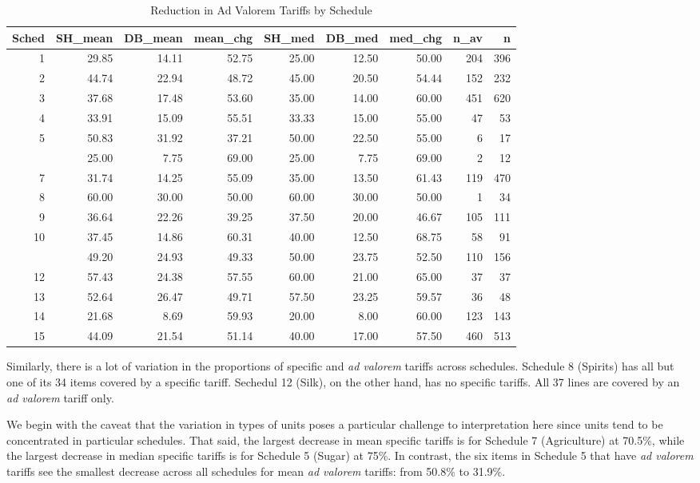\documentclass[
  12pt,
]{article}
\begin{document}
\begin{table}

\caption{\label{tab:av-sc}Reduction in Ad Valorem Tariffs by Schedule}
\centering
\begin{tabular}[t]{rrrrrrrrr}
\toprule
Sched & SH\_mean & DB\_mean & mean\_chg & SH\_med & DB\_med & med\_chg & n\_av & n\\
\midrule
1 & 29.85 & 14.11 & 52.75 & 25.00 & 12.50 & 50.00 & 204 & 396\\
2 & 44.74 & 22.94 & 48.72 & 45.00 & 20.50 & 54.44 & 152 & 232\\
3 & 37.68 & 17.48 & 53.60 & 35.00 & 14.00 & 60.00 & 451 & 620\\
4 & 33.91 & 15.09 & 55.51 & 33.33 & 15.00 & 55.00 & 47 & 53\\
5 & 50.83 & 31.92 & 37.21 & 50.00 & 22.50 & 55.00 & 6 & 17\\
\addlinespace
6 & 25.00 & 7.75 & 69.00 & 25.00 & 7.75 & 69.00 & 2 & 12\\
7 & 31.74 & 14.25 & 55.09 & 35.00 & 13.50 & 61.43 & 119 & 470\\
8 & 60.00 & 30.00 & 50.00 & 60.00 & 30.00 & 50.00 & 1 & 34\\
9 & 36.64 & 22.26 & 39.25 & 37.50 & 20.00 & 46.67 & 105 & 111\\
10 & 37.45 & 14.86 & 60.31 & 40.00 & 12.50 & 68.75 & 58 & 91\\
\addlinespace
11 & 49.20 & 24.93 & 49.33 & 50.00 & 23.75 & 52.50 & 110 & 156\\
12 & 57.43 & 24.38 & 57.55 & 60.00 & 21.00 & 65.00 & 37 & 37\\
13 & 52.64 & 26.47 & 49.71 & 57.50 & 23.25 & 59.57 & 36 & 48\\
14 & 21.68 & 8.69 & 59.93 & 20.00 & 8.00 & 60.00 & 123 & 143\\
15 & 44.09 & 21.54 & 51.14 & 40.00 & 17.00 & 57.50 & 460 & 513\\
\bottomrule
\end{tabular}
\end{table}

Similarly, there is a lot of variation in the proportions of specific and \emph{ad valorem} tariffs across schedules. Schedule 8 (Spirits) has all but one of its 34 items covered by a specific tariff. Sechedul 12 (Silk), on the other hand, has no specific tariffs. All 37 lines are covered by an \emph{ad valorem} tariff only.

We begin with the caveat that the variation in types of units poses a particular challenge to interpretation here since units tend to be concentrated in particular schedules. That said, the largest decrease in mean specific tariffs is for Schedule 7 (Agriculture) at 70.5\%, while the largest decrease in median specific tariffs is for Schedule 5 (Sugar) at 75\%. In contrast, the six items in Schedule 5 that have \emph{ad valorem} tariffs see the smallest decrease across all schedules for mean \emph{ad valorem} tariffs: from 50.8\% to 31.9\%.
\end{document}
